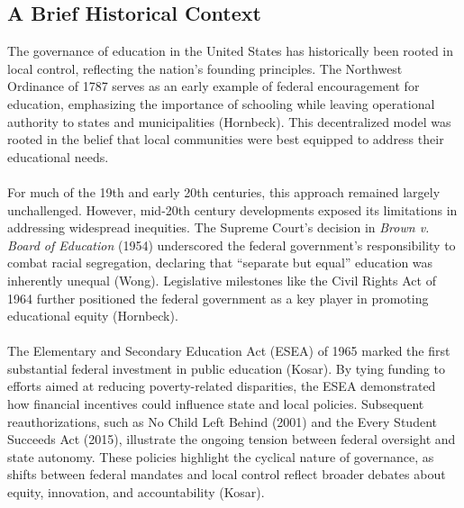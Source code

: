 \documentclass[11pt]{extarticle}
\begin{document}
\subsection{A Brief Historical Context}
The governance of education in the United States has historically been rooted in local control, reflecting the nation's founding principles. The Northwest Ordinance of 1787 serves as an early example of federal encouragement for education, emphasizing the importance of schooling while leaving operational authority to states and municipalities (Hornbeck). This decentralized model was rooted in the belief that local communities were best equipped to address their educational needs.\\
\\
For much of the 19th and early 20th centuries, this approach remained largely unchallenged. However, mid-20th century developments exposed its limitations in addressing widespread inequities. The Supreme Court’s decision in \textit{Brown v. Board of Education} (1954) underscored the federal government’s responsibility to combat racial segregation, declaring that “separate but equal” education was inherently unequal (Wong). Legislative milestones like the Civil Rights Act of 1964 further positioned the federal government as a key player in promoting educational equity (Hornbeck).\\
\\
The Elementary and Secondary Education Act (ESEA) of 1965 marked the first substantial federal investment in public education (Kosar). By tying funding to efforts aimed at reducing poverty-related disparities, the ESEA demonstrated how financial incentives could influence state and local policies. Subsequent reauthorizations, such as No Child Left Behind (2001) and the Every Student Succeeds Act (2015), illustrate the ongoing tension between federal oversight and state autonomy. These policies highlight the cyclical nature of governance, as shifts between federal mandates and local control reflect broader debates about equity, innovation, and accountability (Kosar).
\end{document}
